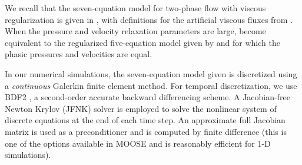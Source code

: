 We recall that the seven-equation model for two-phase flow with viscous regularization is given 
in , with definitions for the artificial viscous fluxes 
from . 
%
When the pressure and velocity relaxation parameters are large,  
become equivalent to the regularized five-equation model given by  and for which 
the phasic pressures and velocities are equal.


In our numerical simulations, the seven-equation model given is discretized using a \emph{continuous} Galerkin 
finite element method.  
For temporal discretization, we use BDF2 \cite{bdf2}, a second-order accurate backward differencing scheme. 
A Jacobian-free Newton Krylov (JFNK) solver is employed to solve the nonlinear system of discrete equations 
at the end of each time step. An approximate full Jacobian matrix is used as a preconditioner and is computed by finite difference 
(this is one of the options available in MOOSE and is reasonably efficient for 1-D simulations). 

